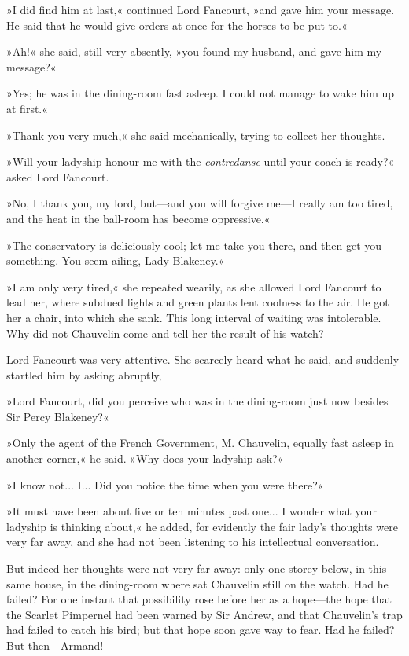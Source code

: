 »I did find him at last,« continued Lord Fancourt, »and gave him your message. He said that he would give orders at once for the horses to be put to.«

»Ah!« she said, still very absently, »you found my husband, and gave him my message?«

»Yes; he was in the dining-room fast asleep. I could not manage to wake him up at first.«

»Thank you very much,« she said mechanically, trying to collect her thoughts.

»Will your ladyship honour me with the \textit{contredanse} until your coach is ready?« asked Lord Fancourt.

»No, I thank you, my lord, but\allowbreak---\allowbreak and you will forgive me\allowbreak---\allowbreak I really am too tired, and the heat in the ball-room has become oppressive.«

»The conservatory is deliciously cool; let me take you there, and then get you something. You seem ailing, Lady Blakeney.«

»I am only very tired,« she repeated wearily, as she allowed Lord Fancourt to lead her, where subdued lights and green plants lent coolness to the air. He got her a chair, into which she sank. This long interval of waiting was intolerable. Why did not Chauvelin come and tell her the result of his watch?

Lord Fancourt was very attentive. She scarcely heard what he said, and suddenly startled him by asking abruptly,\longdash


»Lord Fancourt, did you perceive who was in the dining-room just now besides Sir Percy Blakeney?«

»Only the agent of the French Government, M. Chauvelin, equally fast asleep in another corner,« he said. »Why does your ladyship ask?«

»I know not... I... Did you notice the time when you were there?«

»It must have been about five or ten minutes past one... I wonder what your ladyship is thinking about,« he added, for evidently the fair lady's thoughts were very far away, and she had not been listening to his intellectual conversation.

But indeed her thoughts were not very far away: only one storey below, in this same house, in the dining-room where sat Chauvelin still on the watch. Had he failed? For one instant that possibility rose before her as a hope\allowbreak---\allowbreak the hope that the Scarlet Pimpernel had been warned by Sir Andrew, and that Chauvelin's trap had failed to catch his bird; but that hope soon gave way to fear. Had he failed? But then\allowbreak---\allowbreak Armand!

